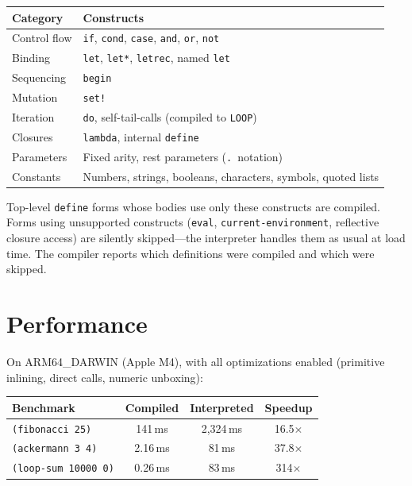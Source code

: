 \documentclass[12pt]{report}
\begin{document}
\begin{center}
\begin{tabular}{ll}
\toprule
\textbf{Category} & \textbf{Constructs} \\
\midrule
Control flow & \texttt{if}, \texttt{cond}, \texttt{case}, \texttt{and}, \texttt{or}, \texttt{not} \\
Binding      & \texttt{let}, \texttt{let*}, \texttt{letrec}, named \texttt{let} \\
Sequencing   & \texttt{begin} \\
Mutation     & \texttt{set!} \\
Iteration    & \texttt{do}, self-tail-calls (compiled to \texttt{LOOP}) \\
Closures     & \texttt{lambda}, internal \texttt{define} \\
Parameters   & Fixed arity, rest parameters (\texttt{.}~notation) \\
Constants    & Numbers, strings, booleans, characters, symbols, quoted lists \\
\bottomrule
\end{tabular}
\end{center}

Top-level \texttt{define} forms whose bodies use only
these constructs are compiled.  Forms using unsupported constructs
(\texttt{eval}, \texttt{current-environment}, reflective closure
access) are silently skipped---the interpreter handles them as usual
at load time.  The compiler reports which definitions were compiled
and which were skipped.

\section{Performance}

On ARM64\_DARWIN (Apple M4), with all optimizations enabled
(primitive inlining, direct calls, numeric unboxing):

\begin{center}
\begin{tabular}{lccc}
\toprule
\textbf{Benchmark} & \textbf{Compiled} & \textbf{Interpreted} & \textbf{Speedup} \\
\midrule
\texttt{(fibonacci 25)}       & 141\,ms    & 2,324\,ms   & 16.5$\times$ \\
\texttt{(ackermann 3 4)}      & 2.16\,ms   & 81\,ms      & 37.8$\times$ \\
\texttt{(loop-sum 10000 0)}   & 0.26\,ms   & 83\,ms      & 314$\times$ \\
\bottomrule
\end{tabular}
\end{center}
\end{document}
